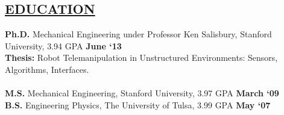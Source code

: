 \documentclass[line,margin]{res}
\begin{document}
\begin{resume}
\section{\underline{EDUCATION}}
\vspace{1.0pc}
\textbf{Ph.D.} Mechanical Engineering under Professor Ken Salisbury, Stanford University, 3.94 GPA
\hfill \textbf{June `13}%
{ {\small
\\[0.0pc]{\bf Thesis:} Robot Telemanipulation in Unstructured Environments: Sensors, Algorithms, Interfaces.
\\[-0.6pc]} }
%
\\[0.0pc]\textbf{M.S.} Mechanical Engineering, Stanford University, 3.97 GPA \hfill  \textbf{March `09}
\\[0.0pc]\textbf{B.S.} Engineering Physics, The University of Tulsa, 3.99 GPA \hfill \textbf{May `07}
%

%
%

\end{resume}
\end{document}
